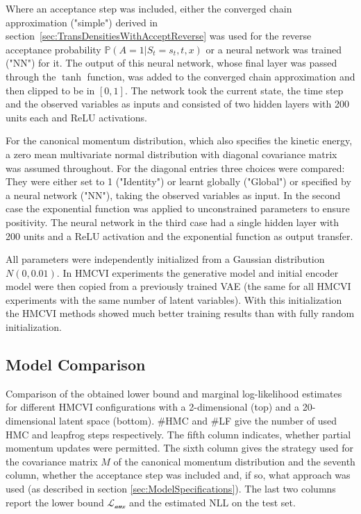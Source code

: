Where an acceptance step was included, either the converged chain approximation ("simple") derived in section~\ref{sec:TransDensitiesWithAcceptReverse} was used for the reverse acceptance probability $\mathbb{P}(A = 1|S_t = s_t, t, x)$ or a neural network was trained ("NN") for it. The output of this neural network, whose final layer was passed through the $\tanh$ function, was added to the converged chain approximation and then clipped to be in $[0, 1]$. The network took the current state, the time step and the observed variables as inputs and consisted of two hidden layers with 200 units each and ReLU activations.

For the canonical momentum distribution, which also specifies the kinetic energy, a zero mean multivariate normal distribution with diagonal covariance matrix was assumed throughout. For the diagonal entries three choices were compared: They were either set to 1 ("Identity") or learnt globally ("Global") or specified by a neural network ("NN"), taking the observed variables as input. In the second case the exponential function was applied to unconstrained parameters to ensure positivity. The neural network in the third case had a single hidden layer with 200 units and a ReLU activation and the exponential function as output transfer.

All parameters were independently initialized from a Gaussian distribution $N(0, 0.01)$. In HMCVI experiments the generative model and initial encoder model were then copied from a previously trained VAE (the same for all HMCVI experiments with the same number of latent variables). With this initialization the HMCVI methods showed much better training results than with fully random initialization.

\subsection{Model Comparison}

\begin{table}[ht]
\centering

\caption{Comparison of the obtained lower bound and marginal log-likelihood estimates for different HMCVI configurations with a 2-dimensional (top) and a 20-dimensional latent space (bottom). \#HMC and \#LF give the number of used HMC and leapfrog steps respectively. The fifth column indicates, whether partial momentum updates were permitted. The sixth column gives the strategy used for the covariance matrix $M$ of the canonical momentum distribution and the seventh column, whether the acceptance step was included and, if so, what approach was used (as described in section \ref{sec:ModelSpecifications}). The last two columns report the lower bound $\mathcal{L_\textrm{aux}}$ and the estimated NLL on the test set.}
\label{tab:Results}
\end{table}

